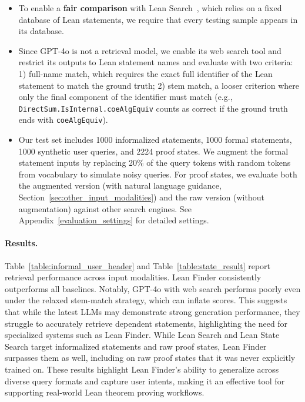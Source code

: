 \documentclass{article} %
\begin{document}
\begin{itemize}[leftmargin=*]
\item
To enable a \textbf{fair comparison} with Lean Search~\citep{gao2024semantic,gao2024herald}, which relies on a fixed database of Lean statements, we require that every testing sample appears in its database.

\item
Since GPT-4o is not a retrieval model, we enable its web search tool and restrict its outputs to Lean statement names and evaluate with two criteria: 1) full-name match, which requires the exact full identifier of the Lean statement to match the ground truth; 2) stem match, a looser criterion where only the final component of the identifier must match (e.g., \texttt{DirectSum.IsInternal.coeAlgEquiv} counts as correct if the ground truth ends with \texttt{coeAlgEquiv}).

\item
Our test set includes 1000 informalized statements, 1000 formal statements, 1000 synthetic user queries, and 2224 proof states. We augment the formal statement inputs by replacing 20\% of the query tokens with random tokens from vocabulary to simulate noisy queries. For proof states, we evaluate both the augmented version (with natural language guidance, Section~\ref{sec:other_input_modalities}) and the raw version (without augmentation) against other search engines. See Appendix~\ref{evaluation_settings} for detailed settings.
\end{itemize}

\paragraph{Results.}

Table~\ref{table:informal_user_header} and Table~\ref{table:state_result} report retrieval performance across input modalities. Lean Finder consistently outperforms all baselines. Notably, GPT-4o with web search performs poorly even under the relaxed stem-match strategy, which can inflate scores.
This suggests that while the latest LLMs may demonstrate strong generation performance, they struggle to accurately retrieve dependent statements, highlighting the need for specialized systems such as Lean Finder.
While Lean Search and Lean State Search target informalized statements and raw proof states, Lean Finder surpasses them as well, including on raw proof states that it was never explicitly trained on. These results highlight Lean Finder’s ability to generalize across diverse query formats and capture user intents, making it an effective tool for supporting real-world Lean theorem proving workflows.
\end{document}
